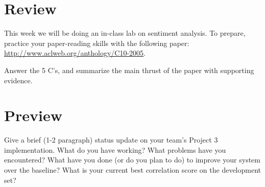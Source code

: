\documentclass[11pt,letterpaper,boxed]{hmcpset}
\begin{document}
\section*{Review} 

This week we will be doing an in-class lab on sentiment analysis. To
prepare, practice your paper-reading skills with the following paper:
\url{http://www.aclweb.org/anthology/C10-2005}. 

\begin{problem}
Answer the 5 C's, and summarize the main thrust of the paper with
supporting evidence.
\end{problem}

\pagebreak

\section*{Preview} 

\begin{problem}
Give a brief (1-2 paragraph) status update on your team's Project 3
implementation. What do you have working? What problems have you
encountered? What have you done (or do you plan to do) to improve your
system over the baseline? What is your current best correlation score
on the development set? 
\end{problem} 
\end{document}
